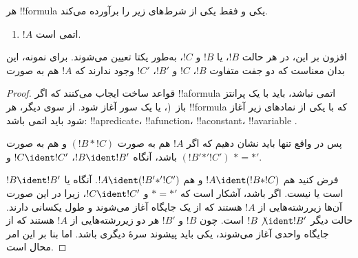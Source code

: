 \documentclass[../../../include/open-logic-section]{subfiles}
\begin{document}
\begin{prop}
هر !!{formula} یکی و فقط یکی از شرط‌های زیر را برآورده می‌کند.
\begin{enumerate}
\item $!A$ اتمی است.







\end{enumerate}
افزون بر این، در هر حالت $!B$، یا $!B$ و $!C$، به‌طور یکتا تعیین می‌شوند.
برای نمونه، این بدان معناست که دو جفت متفاوت $!B$، $!C$ و $!B'$، $!C'$
وجود ندارند که $!A$ هم به صورت
\end{prop}

\begin{proof}
قواعد ساخت ایجاب می‌کنند که اگر !!a{formula} اتمی نباشد، باید با یک
پرانتز باز~(،  یا یک سور آغاز شود. از سوی دیگر،
هر !!{formula} که با یکی از نمادهای زیر آغاز شود باید اتمی باشد:
!!a{predicate}، !!a{function}، !!a{constant}، !!a{variable}
.

پس در واقع تنها باید نشان دهیم که اگر $!A$ هم به صورت $(!B \ast
!C)$ و هم به صورت $(!B' \mathbin{\ast'} !C')$ باشد، آنگاه $!B \ident
!B'$، $!C \ident !C'$ و $\ast = {\ast'}$.

فرض کنید هم $!A \ident (!B \ast !C)$ و هم $!A \ident (!B'
\mathbin{\ast'} !C')$. آنگاه یا $!B \ident !B'$ است یا نیست. اگر باشد،
آشکار است که $\ast = {\ast'}$ و $!C \ident !C'$، زیرا در این صورت آن‌ها
زیررشته‌هایی از $!A$ هستند که از یک جایگاه آغاز می‌شوند و طول یکسانی دارند.
حالت دیگر $!B \not\ident !B'$ است. چون $!B$ و $!B'$ هر دو زیررشته‌هایی از
$!A$ هستند که از جایگاه واحدی آغاز می‌شوند، یکی باید پیشوند سرهٔ دیگری
باشد. اما بنا بر  این امر محال است.
\end{proof}
\end{document}
